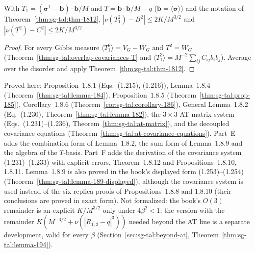 \begin{theorem}
\label{thm:sg-tal:prop-18-10-11}
  \leanok
{}
With $T_1=(\boldsymbol\sigma^1-\mathbf b)\cdot\mathbf b/M$ and $T=\mathbf b\cdot\mathbf b/M-q$ ($\mathbf b=\langle\boldsymbol\sigma\rangle$) and the notation of Theorem~\ref{thm:sg-tal:thm-1812}, $|\nu(T_1^2)-B^2|\le 2K/M^{3/2}$ and $|\nu(T^2)-C^2|\le 2K/M^{3/2}$.
\end{theorem}
\begin{proof}
  \leanok
For every Gibbs measure $\langle T_1^2\rangle=V_G-W_G$ and $T^2=W_G$ (Theorem~\ref{thm:sg-tal:overlap-covariances-T} and $\langle T_1^2\rangle=M^{-2}\sum_{ij}C_{ij}b_ib_j$).  Average over the disorder and apply Theorem~\ref{thm:sg-tal:thm-1812}.
\end{proof}

\begin{remark}
\label{rem:sg-tal:remaining-18}
Proved here: Proposition~1.8.1 (Eqs.~(1.215), (1.216)), Lemma~1.8.4 (Theorem~\ref{thm:sg-tal:lemma-184}), Proposition~1.8.5 (Theorem~\ref{thm:sg-tal:prop-185}), Corollary~1.8.6 (Theorem~\ref{cor:sg-tal:corollary-186}), General Lemma~1.8.2 (Eq.~(1.230), Theorem~\ref{thm:sg-tal:lemma-182}), the $3\times3$ AT matrix system (Eqs.~(1.231)--(1.236), Theorem~\ref{thm:sg-tal:at-matrix}), and the decoupled covariance equations (Theorem~\ref{thm:sg-tal:at-covariance-equations}).
Part~E adds the combination form of Lemma~1.8.2, the sum form of Lemma~1.8.9 and the algebra of the $T$-basis.
Part~F adds the derivation of the covariance system (1.231)--(1.233) with explicit errors, Theorem~1.8.12 and Propositions~1.8.10, 1.8.11.
Lemma~1.8.9 is also proved in the book's displayed form (1.253)--(1.254) (Theorem~\ref{thm:sg-tal:lemma-189-displayed}), although the covariance system is used instead of the six-replica proofs of Propositions~1.8.8 and 1.8.10 (their conclusions are proved in exact form).
Not formalized: the book's $O(3)$ remainder is an explicit $K/M^{3/2}$ only under $4\beta^2<1$; the version with the remainder $K(M^{-3/2}+\nu(|R_{1,2}-q|^3))$ needed beyond the AT line is a separate development, valid for every $\beta$ (Section~\ref{sec:sg-tal:beyond-at}, Theorem~\ref{thm:sg-tal:lemma-194}).
\end{remark}

